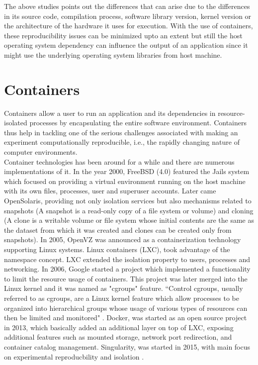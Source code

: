 The above studies points out the differences that can arise due to the differences in its source code, compilation process, software library version, kernel version or the architecture of the hardware it uses for execution. With the use of containers, these reproducibility issues can be minimized upto an extent but still the host operating system dependency can influence the output of an application since it might use the underlying operating system libraries from host machine.

\section{Containers}
Containers allow a user to run an application and its dependencies in resource-isolated processes by encapsulating the entire software environment. Containers thus help in tackling one of the serious challenges associated with making an experiment computationally reproducible, i.e., the rapidly changing nature of computer environments. \\

Container technologies has been around for a while and there are numerous implementations of it. In the year 2000, FreeBSD (4.0) featured the Jails system which focused on providing a virtual environment running on the host machine with its own files, processes, user and superuser accounts. Later came OpenSolaris, providing not only isolation services but also mechanisms related to snapshots (A snapshot is a read-only copy of a file system or volume)  and cloning (A clone is a writable volume or file system whose initial contents are the same as the dataset from which it was created and clones can be created only from snapshots). In 2005, OpenVZ was announced as a containerization technology supporting Linux systems. Linux containers (LXC), took advantage of the namespace concept. LXC extended the isolation property to users, processes and networking. In 2006, Google started a project which implemented a functionality to limit the resource usage of containers. This project was later merged into the Linux kernel and it was named as "cgroups" feature. ``Control cgroups, usually referred to as cgroups, are a Linux kernel feature which allow processes to be organized into hierarchical groups whose usage of various types of resources can then be limited and monitored" \cite{cgroups}. Docker, was started as an open source project in 2013, which basically added an additional layer on top of LXC, exposing additional features such as mounted storage, network port redirection, and container catalog management. Singularity, was started in 2015, with main focus on experimental reproducbility and isolation \cite{Xavier:2013:PEC:2497369.2497577}.\\

